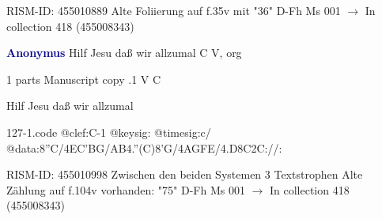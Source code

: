 \documentclass[twocolumn]{book}
\begin{document}
\newline RISM-ID: 455010889
\newline Alte Foliierung auf f.35v mit "36"
\newline D-Fh  Ms 001
\newline $\rightarrow$ In collection 418 (455008343)

\newline \par \vspace{7pt} \textcolor{darkblue}{\textbf{Anonymus  }}
\newline Hilf Jesu daß wir allzumal  C  
\newline V, org
\newline \begin{itshape}\end{itshape} 
\newline \textcolor{darkblue}{}  1 parts  
\newline Manuscript copy
.1  V  C
\newline \begin{footnotesize} Hilf Jesu daß wir allzumal \end{footnotesize}  
\begin{filecontents*}{127-1.code}
@clef:C-1
@keysig:
@timesig:c/
@data:8''C/4EC'BG/AB4.''(C)8'G/4AGFE/4.D8C2C://:
\end{filecontents*}
\newline
%

\newline RISM-ID: 455010998
\newline Zwischen den beiden Systemen 3 Textstrophen
\newline Alte Zählung auf f.104v vorhanden: "75"
\newline D-Fh  Ms 001
\newline $\rightarrow$ In collection 418 (455008343)
\end{document}
